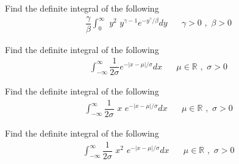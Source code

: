 \begin{exercise}
    Find the definite integral of the following
    \begin{align*}
        \dfrac{\gamma}{\beta} \int_{0}^{\infty} \hspace{4pt} y^{2} \hspace{4pt} y^{\gamma - 1} e^{-y^{\gamma}/\beta} dy \hspace{20pt} \gamma > 0 \hspace{4pt} , \hspace{4pt} \beta > 0
    \end{align*}
\end{exercise}

\begin{exercise}
    Find the definite integral of the following
    \begin{align*}
        \int_{-\infty}^{\infty} \dfrac{1}{2 \sigma} e^{-\lvert x-\mu \rvert/\sigma} dx \hspace{20pt} \mu \in \mathbb{R} \hspace{4pt} , \hspace{4pt} \sigma > 0
    \end{align*} 
\end{exercise}

\begin{exercise}
    Find the definite integral of the following
    \begin{align*}
        \int_{-\infty}^{\infty} \dfrac{1}{2 \sigma} \hspace{4pt} x \hspace{4pt} e^{-\lvert x-\mu \rvert/\sigma} dx \hspace{20pt} \mu \in \mathbb{R} \hspace{4pt} , \hspace{4pt} \sigma > 0
    \end{align*} 
\end{exercise}

\begin{exercise}
    Find the definite integral of the following
    \begin{align*}
        \int_{-\infty}^{\infty} \dfrac{1}{2 \sigma} \hspace{4pt} x^{2} \hspace{4pt} e^{-\lvert x-\mu \rvert/\sigma} dx \hspace{20pt} \mu \in \mathbb{R} \hspace{4pt} , \hspace{4pt} \sigma > 0
    \end{align*} 
\end{exercise}

